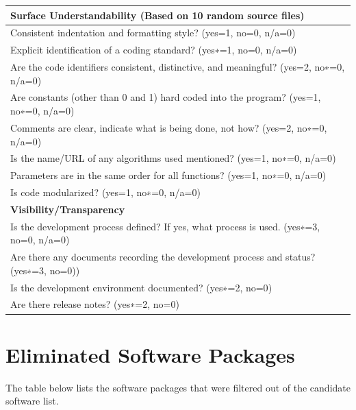 \documentclass[12pt, notitlepage]{article}
\begin{document}
\begin{appendices}
\begin{singlespace}
\def\arraystretch{1.4}
\begin{tabular}{p{14cm}}
\hline	
\textbf{Surface Understandability (Based on 10 random source files)}\\
\hline
Consistent indentation and formatting style? ({yes=1, no=0, n/a=0})\\
Explicit identification of a coding standard? ({yes∗=1, no=0, n/a=0})\\
Are the code identifiers consistent, distinctive, and meaningful? ({yes=2, no∗=0, n/a=0})\\
Are constants (other than 0 and 1) hard coded into the program? ({yes=1, no∗=0, n/a=0})\\
Comments are clear, indicate what is being done, not how? ({yes=2, no∗=0, n/a=0})\\
Is the name/URL of any algorithms used mentioned? ({yes=1, no∗=0, n/a=0})\\
Parameters are in the same order for all functions? ({yes=1, no∗=0, n/a=0})\\
Is code modularized? ({yes=1, no∗=0, n/a=0})\\
\hline		
\textbf{Visibility/Transparency}\\
\hline
Is the development process defined? If yes, what process is used. ({yes∗=3, no=0, n/a=0})\\
Are there any documents recording the development process and status?  ({yes∗=3, no=0}))\\
Is the development environment documented? ({yes∗=2, no=0})\\
Are there release notes? ({yes∗=2, no=0})\\
\hline
\end{tabular}

\newpage

\section{Eliminated Software Packages}\label{eliminatedpackagessection}

The table below lists the software packages that were filtered out of the candidate software list. 


\end{singlespace}
\end{appendices}
\end{document}
